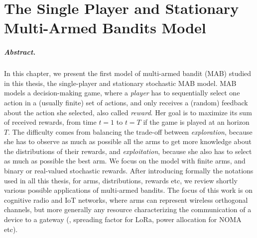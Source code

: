 
\chapter{The Single Player and Stationary Multi-Armed Bandits Model}
\label{chapter:2}
\minitoc



\paragraph{Abstract.}
%
In this chapter, we present the first model of multi-armed bandit (MAB) studied in this thesis,
the single-player and stationary stochastic MAB model.
MAB models a decision-making game, where a \emph{player} has to sequentially select one action in a (usually finite) set of actions, and only receives a (random) feedback about the action she selected, also called \emph{reward}.
Her goal is to maximize its sum of received rewards, from time $t=1$ to $t=T$ if the game is played at an horizon $T$. The difficulty comes from balancing the trade-off between \emph{exploration}, because she has to observe as much as possible all the arms to get more knowledge about the distributions of their rewards, and \emph{exploitation}, because she also has to select as much as possible the best arm.
%
We focus on the model with finite arms, and binary or real-valued stochastic rewards.
After introducing formally the notations used in all this thesis, for arms, distributions, rewards etc, we review shortly various possible applications of multi-armed bandits.
The focus of this work is on cognitive radio and IoT networks, where arms can represent wireless orthogonal channels, but more generally any resource characterizing the communication of a device to a gateway (\eg, spreading factor for LoRa, power allocation for NOMA etc).

